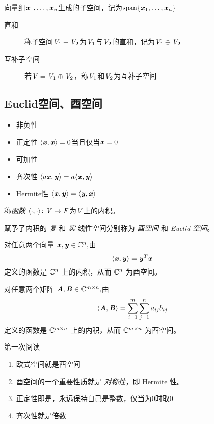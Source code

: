 \begin{definition}[线性子空间]
    向量组$\boldsymbol{\mathit{x}}_1, \ldots, \boldsymbol{\mathit{x}}_n$生成的子空间，记为$\mathrm{span}\{\boldsymbol{\mathit{x}}_1, \ldots, \boldsymbol{\mathit{x}}_n\}$
\end{definition}

\begin{definition}
    \begin{description}
        \item[直和] 称子空间$\mathit{V}_1 + \mathit{V}_2$为$\mathit{V}_1$与$\mathit{V}_2$的直和，记为$\mathit{V}_1 \oplus \mathit{V}_2$
        \item[互补子空间] 若$\mathit{V} = \mathit{V}_1 \oplus \mathit{V}_2$，称$\mathit{V}_1$和$\mathit{V}_2$为互补子空间
    \end{description}
\end{definition}

\subsection{Euclid空间、酉空间}
\label{sub:Euclid空间、酉空间}

\begin{definition}[内积]
    \begin{itemize}
        \item 非负性
        \item 正定性 $\langle\boldsymbol{\mathit{x}},\boldsymbol{\mathit{x}}\rangle=0$当且仅当$\boldsymbol{\mathit{x}} = 0$
        \item 可加性
        \item 齐次性 $\langle a \boldsymbol{\mathit{x}}, \boldsymbol{\mathit{y}} \rangle = a \langle \boldsymbol{\mathit{x}}, \boldsymbol{\mathit{y}} \rangle$
        \item Hermite性 $\langle \boldsymbol{\mathit{x}}, \boldsymbol{\mathit{y}} \rangle = \langle \boldsymbol{\mathit{y}}, \boldsymbol{\mathit{x}} \rangle$
    \end{itemize}

    称\emph{函数} $\langle \cdot, \cdot \rangle \colon \mathit{V} \to \mathit{F}$为$\mathit{V}$上的内积。

    赋予了内积的 \emph{复} 和 \emph{实} 线性空间分别称为 \emph{酉空间} 和 \emph{Euclid 空间}。

    对任意两个向量 $\boldsymbol{\mathit{x}}, \boldsymbol{\mathit{y}} \in \mathbb{C}^{n},$由
    \[
        \langle \boldsymbol{\mathit{x}}, \boldsymbol{\mathit{y}} \rangle = \boldsymbol{\mathit{y}}^T \boldsymbol{\mathit{x}}
    \]
定义的函数是 $\mathbb{C}^n$ 上的内积，从而 $\mathbb{C}^n$ 为酉空间。

    对任意两个矩阵 $\boldsymbol{\mathit{A}}, \boldsymbol{\mathit{B}} \in \mathbb{C}^{m \times n}, $由
    \[
        \langle \boldsymbol{\mathit{A}} , \boldsymbol{\mathit{B}} \rangle = \sum_{i = 1}^{m} \sum_{j=1}^{n} a_{ij} b_{ij}
    \]
定义的函数是 $\mathbb{C}^{m \times n}$ 上的内积，从而 $\mathbb{C}^{m \times n}$ 为酉空间。

    {\kaishu
    第一次阅读
        \begin{enumerate}
            \item 欧式空间就是酉空间
            \item 酉空间的一个重要性质就是 \emph{对称性}，即 Hermite 性。
            \item 正定性即是，永远保持自己是整数，仅当为0时取0
            \item 齐次性就是倍数
        \end{enumerate}
    }
\end{definition}

